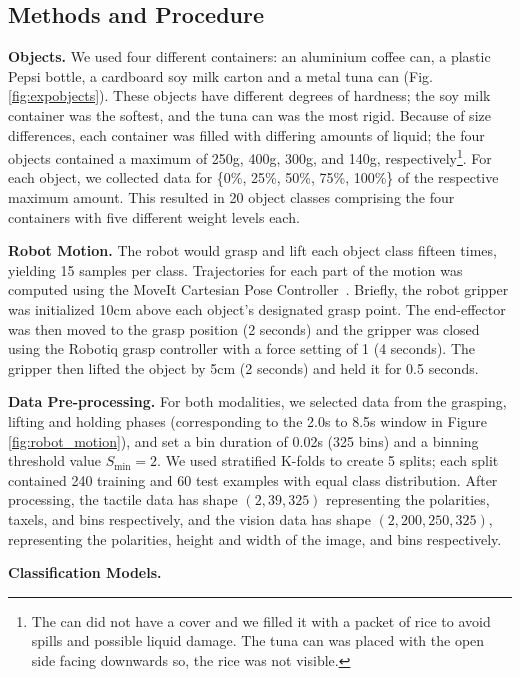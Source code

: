 \documentclass[fyp]{socreport}
\begin{document}
\subsection{Methods and Procedure}

\noindent\textbf{Objects.} We used four different containers: an aluminium
coffee can, a plastic Pepsi bottle, a cardboard soy milk carton and a metal tuna
can (Fig. \ref{fig:expobjects}). These objects have different degrees of
hardness; the soy milk container was the softest, and the tuna can was the most
rigid. Because of size differences, each container was filled with differing
amounts of liquid; the four objects contained a maximum of 250g, 400g, 300g, and
140g, respectively\footnote{The can did not have a cover and we filled it with a
  packet of rice to avoid spills and possible liquid damage. The tuna can was
  placed with the open side facing downwards so, the rice was not visible.}. For
each object, we collected data for \{0\%, 25\%, 50\%, 75\%, 100\%\} of the
respective maximum amount. This resulted in 20 object classes comprising the
four containers with five different weight levels each.

\noindent\textbf{Robot Motion.} The robot would grasp and lift each object class
fifteen times, yielding 15 samples per class. Trajectories for each part of the
motion was computed using the MoveIt Cartesian Pose
Controller~\cite{coleman2014reducing}. Briefly, the robot gripper was
initialized 10cm above each object's designated grasp point. The end-effector
was then moved to the grasp position (2 seconds) and the gripper was closed
using the Robotiq grasp controller with a force setting of 1 (4 seconds). The
gripper then lifted the object by 5cm (2 seconds) and held it for 0.5 seconds.

\noindent\textbf{Data Pre-processing.}
For both modalities, we selected data from the grasping, lifting and holding
phases (corresponding to the 2.0s to 8.5s window in Figure
\ref{fig:robot_motion}), and set a bin duration of 0.02s (325 bins) and a
binning threshold value $S_{\text{min}} = 2$. We used stratified K-folds to
create 5 splits; each split contained 240 training and 60 test examples with
equal class distribution. After processing, the tactile data has shape
$(2, 39, 325)$ representing the polarities, taxels, and bins respectively, and
the vision data has shape $(2, 200, 250, 325)$, representing the polarities,
height and width of the image, and bins respectively.

\noindent\textbf{Classification Models.}
\end{document}
